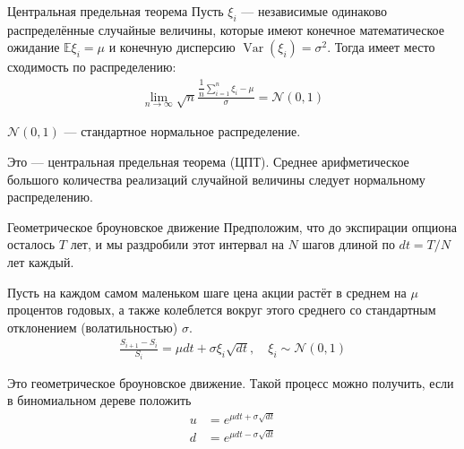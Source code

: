 \documentclass{beamer}
\begin{document}
\begin{frame}{Центральная предельная теорема}
\justify
Пусть $\xi_i$ --- независимые одинаково распределённые случайные величины, которые имеют конечное математическое ожидание $\mathbb{E}\xi_i=\mu$ и конечную дисперсию $\operatorname{Var}(\xi_i) = \sigma^2$. Тогда имеет место сходимость по распределению:
\begin{align*}
\lim_{n \to \infty} \sqrt{n}\frac{\dfrac{1}{n}\sum\limits_{i=1}^{n}\xi_i - \mu}{\sigma} = \mathcal{N}(0, 1)
\end{align*}

\justify
$\mathcal{N}(0, 1)$ --- стандартное нормальное распределение.

\justify
Это --- центральная предельная теорема (ЦПТ). Среднее арифметическое большого количества реализаций случайной величины следует нормальному распределению.
\end{frame}



\begin{frame}{Геометрическое броуновское движение}
\justify
Предположим, что до экспирации опциона осталось $T$ лет, и мы раздробили этот интервал на $N$ шагов длиной по $dt = T/N$ лет каждый.

\justify
Пусть на каждом самом маленьком шаге цена акции растёт в среднем на $
\mu$ процентов годовых, а также колеблется вокруг этого среднего со 
стандартным отклонением (волатильностью) $\sigma$.
\begin{align*}
\frac{S_{i+1} - S_i}{S_i} = \mu dt + \sigma\xi_i\sqrt{dt}, \quad \xi_i \sim \mathcal{N}(0, 1)
\end{align*}

\justify
Это геометрическое броуновское движение. Такой процесс можно получить, если в биномиальном дереве положить
\begin{align*}
u &= e^{\mu dt + \sigma\sqrt{dt}} \\
d &= e^{\mu dt - \sigma\sqrt{dt}}
\end{align*}
\end{frame}



\newcommand{\plotBrownianMotion}[2] {
	
	\addplot[
		color = #2,
		mark = none,
		thick
	]
	table[
		x=t,
		y=s,
		col sep=comma
	]
	{#1};
	
	\addplot[
		color = #2,
		mark = none,
		thick,
		dashed,
		forget plot
	] 
	table[
		x=t,
		y=trend,
		col sep=comma
	]
	{#1};
}
\end{document}
